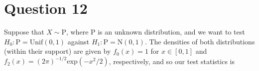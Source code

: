 \documentclass[10pt]{article}
\begin{document}
\section{Question 12} \noindent
Suppose that \(X \sim \mathrm{P}\), where \(\mathrm{P}\) is an unknown distribution, and we want to test \(H_0: \mathrm{P} = \mathrm{Unif}(0,1)\) against 
\(H_1: \mathrm{P} = \mathrm{N}(0, 1)\). The densities of both distributions (within their support) are given by \(f_0(x) = 1\) for \(x \in [0,1]\) and 
\(f_2(x) = (2\pi)^{-1/2}\mathrm{exp}(-x^2 / 2)\), respectively, and so our test statistics is 

\end{document}
